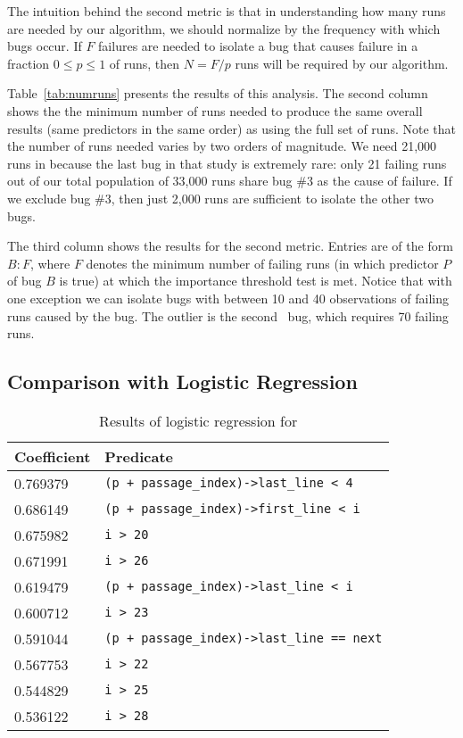 The intuition behind the second metric is that in understanding how
many runs are needed by our algorithm, we should normalize by the
frequency with which bugs occur.  If $F$ failures are needed to
isolate a bug that causes failure in a fraction $0 \leq p \leq 1$ of
runs, then $N = F/p$ runs will be required by our
algorithm.

Table~\ref{tab:numruns} presents the results of this analysis.  The
second column shows the the minimum number of runs needed to produce
the same overall results (same predictors in the same order) as using
the full set of runs.  Note that the number of runs needed varies by
two orders of magnitude.  We need 21,000 runs in \exif
because the last bug in that study is extremely rare: only
21 failing runs out of our total population of 33,000 runs share bug
\#3 as the cause of failure.  If we exclude bug \#3, then just 2,000
runs are sufficient to isolate the other two bugs.

The third column shows the results for the second metric.
Entries are of the form $B : F$, where $F$ denotes
the minimum number of failing runs (in which predictor $P$ of bug $B$ is true)
at which the importance threshold test is met.
Notice that with one exception we can isolate bugs with between 10 and 40 
observations of failing runs caused by the bug.  The outlier is the second
\rhythmbox\ bug, which requires 70 failing runs.


\subsection{Comparison with Logistic Regression}
\label{sec:comparison}

\begin{table}
\nocaptionrule
\caption{Results of logistic regression for \moss}
\label{tab:logregression}
\centering
\scriptsize
\begin{tabular}{ll}
  \toprule
  Coefficient & Predicate \\
  \midrule
  0.769379 & \verb|(p + passage_index)->last_line < 4| \\
  0.686149 & \verb|(p + passage_index)->first_line < i| \\
  0.675982 & \verb|i > 20| \\
  0.671991 & \verb|i > 26| \\
  0.619479 & \verb|(p + passage_index)->last_line < i| \\
  0.600712 & \verb|i > 23| \\
  0.591044 & \verb|(p + passage_index)->last_line == next| \\
  0.567753 & \verb|i > 22| \\
  0.544829 & \verb|i > 25| \\
  0.536122 & \verb|i > 28| \\
  \bottomrule
\end{tabular}
\end{table}


